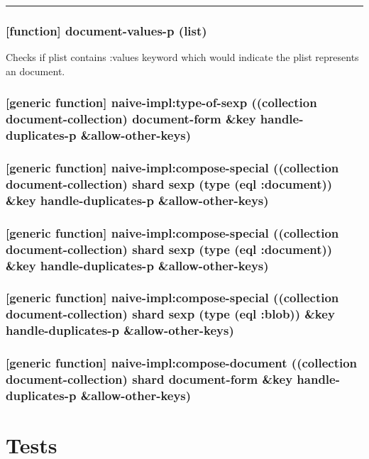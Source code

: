 \documentclass[11pt]{article}
\begin{document}
\noindent\rule{\textwidth}{0.5pt}

\subsubsection{[function] document-values-p (list)}
\label{sec:orgd003147}

Checks if plist contains :values keyword which would indicate the
plist represents an document.

\subsubsection{[generic function] naive-impl:type-of-sexp ((collection document-collection) document-form \&key handle-duplicates-p \&allow-other-keys)}
\label{sec:org34076d3}

\subsubsection{[generic function] naive-impl:compose-special ((collection document-collection) shard sexp (type (eql :document)) \&key handle-duplicates-p \&allow-other-keys)}
\label{sec:orgb86fbc7}

\subsubsection{[generic function] naive-impl:compose-special ((collection document-collection) shard sexp (type (eql :document)) \&key handle-duplicates-p \&allow-other-keys)}
\label{sec:org6b0cbfa}

\subsubsection{[generic function] naive-impl:compose-special ((collection document-collection) shard sexp (type (eql :blob)) \&key handle-duplicates-p \&allow-other-keys)}
\label{sec:org07dec3e}

\subsubsection{[generic function] naive-impl:compose-document ((collection document-collection) shard document-form \&key handle-duplicates-p \&allow-other-keys)}
\label{sec:org133eaeb}

\section{Tests}
\label{sec:orgb557e41}
\end{document}
